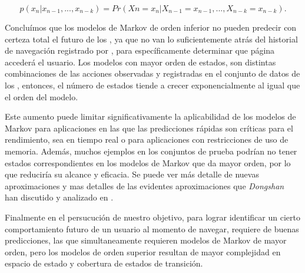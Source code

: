 \begin{equation}\label{eq:tantito}
p( x_{n} | x_{n-1},..., x_{n-k} ) = Pr(X{n} = x_{n}| X_{n-1} = x_{n-1},..., X_{n-k} = x_{n-k}) .
\end{equation}

Concluímos que los modelos de Markov de orden inferior no pueden predecir con certeza total el futuro de los \webasccesslog, ya que no van lo suficientemente atrás del historial de navegación registrado por \webasccesslog, para específicamente determinar que página accederá el usuario. Los modelos con mayor orden de estados, son distintas combinaciones de las acciones observadas y registradas en el conjunto de datos de los \webasccesslog, entonces, el número de estados tiende a crecer exponencialmente al igual que el orden del modelo.

Este aumento puede limitar significativamente la aplicabilidad de los modelos de Markov para aplicaciones en las que las predicciones rápidas son críticas para el rendimiento, sea en tiempo real o para aplicaciones con restricciones de uso de memoria. Además, muchos ejemplos en los conjuntos de prueba podrían no tener estados correspondientes en los modelos de Markov que da mayor orden, por lo que reduciría su alcance y eficacia. Se puede ver más detalle de nuevas aproximaciones y mas detalles de las evidentes aproximaciones que \emph{Dongshan~\etal}  han discutido y analizado en \cite{Dongshan2002}.

Finalmente en el persucución de nuestro objetivo, para lograr identificar un cierto comportamiento futuro de un usuario al momento de navegar, requiere de buenas predicciones, las que simultaneamente requieren modelos de Markov de mayor orden, pero los modelos de orden superior resultan de mayor complejidad en espacio de estado y cobertura de estados de transición. 








